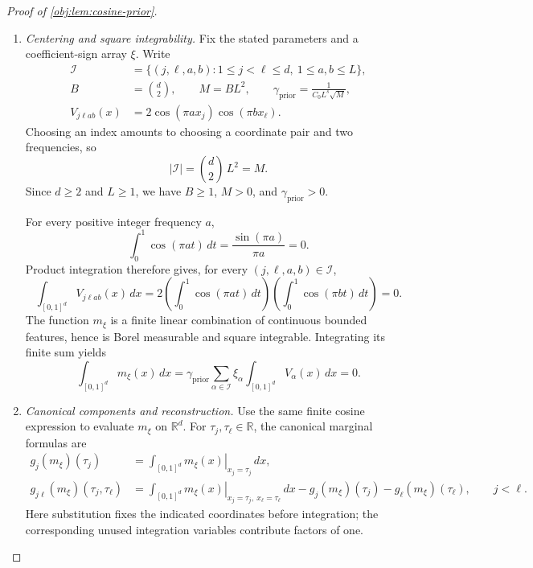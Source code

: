 \documentclass[11pt]{article}
\begin{document}
\begin{proof}[Proof of \cref{obj:lem:cosine-prior}]
\begin{enumerate}
\item \emph{Centering and square integrability.}
Fix the stated parameters and a coefficient-sign array \(\xi\). Write
\[
\begin{aligned}
\mathcal I
&=\{(j,\ell,a,b):1\leq j<\ell\leq d,\ 1\leq a,b\leq L\},\\
B&=\binom d2,\qquad M=BL^2,\qquad
\gamma_{\mathrm{prior}}=\frac{1}{C_0L^s\sqrt M},\\
V_{j\ell ab}(x)
&=2\cos(\pi a x_j)\cos(\pi b x_\ell).
\end{aligned}
\]
Choosing an index amounts to choosing a coordinate pair and two frequencies, so
\[
|\mathcal I|=\binom d2\,L^2=M.
\]
Since \(d\geq2\) and \(L\geq1\), we have \(B\geq1\), \(M>0\), and
\(\gamma_{\mathrm{prior}}>0\).

For every positive integer frequency \(a\),
\[
\int_0^1\cos(\pi a t)\,dt
=\frac{\sin(\pi a)}{\pi a}=0.
\]
Product integration therefore gives, for every \((j,\ell,a,b)\in\mathcal I\),
\[
\int_{[0,1]^d}V_{j\ell ab}(x)\,dx
=2\left(\int_0^1\cos(\pi a t)\,dt\right)
  \left(\int_0^1\cos(\pi b t)\,dt\right)
=0.
\]
The function \(m_\xi\) is a finite linear combination of continuous bounded
features, hence is Borel measurable and square integrable. Integrating its
finite sum yields
\[
\int_{[0,1]^d}m_\xi(x)\,dx
=\gamma_{\mathrm{prior}}
  \sum_{\alpha\in\mathcal I}\xi_\alpha
  \int_{[0,1]^d}V_\alpha(x)\,dx
=0.
\]

\item \emph{Canonical components and reconstruction.}
Use the same finite cosine expression to evaluate \(m_\xi\) on
\(\mathbb R^d\). For \(\tau_j,\tau_\ell\in\mathbb R\), the canonical marginal
formulas are
\[
\begin{aligned}
g_j(m_\xi)(\tau_j)
&=\int_{[0,1]^d}
  \left.m_\xi(x)\right|_{x_j=\tau_j}\,dx,\\
g_{j\ell}(m_\xi)(\tau_j,\tau_\ell)
&=\int_{[0,1]^d}
  \left.m_\xi(x)\right|_{x_j=\tau_j,\ x_\ell=\tau_\ell}\,dx
  -g_j(m_\xi)(\tau_j)-g_\ell(m_\xi)(\tau_\ell),
  \qquad j<\ell.
\end{aligned}
\]
Here substitution fixes the indicated coordinates before integration; the
corresponding unused integration variables contribute factors of one.


\end{enumerate}
\end{proof}
\end{document}
